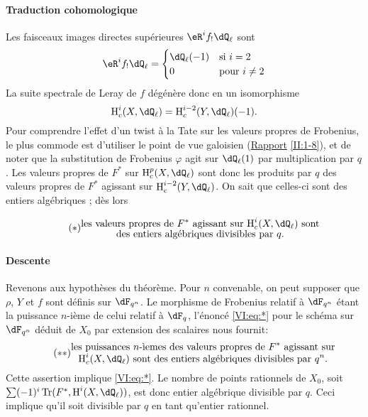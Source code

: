 \paragraph{Traduction cohomologique}
Les faisceaux images directes supérieures $\eR^i f_!\dQ_\ell$ sont 
\[
  \eR^i f_!\dQ_\ell = \begin{cases}
                       \dQ_\ell(-1) & \text{si $i = 2$} \\
                       0            & \text{pour $i\ne 2$}
                     \end{cases}
\]
La suite spectrale de Leray de $f$ dégénère donc en un isomorphisme 
\[
  \h_c^i(X,\dQ_\ell) = \h_c^{i-2}(Y,\dQ_\ell)(-1) \text{.}
\]
Pour comprendre l'effet d'un twist à la Tate sur les valeurs propres de 
Frobenius, le plus commode est d'utiliser le point de vue galoisien 
(\hyperref[II]{Rapport} \ref{II:1-8}), et de noter que la substitution de 
Frobenius $\varphi$ agit sur $\dQ_\ell(1)$ par multiplication par $q$. Les 
valeurs propres de $F^\ast$ sur $\h_c^p(X,\dQ_\ell)$ sont donc les produits par 
$q$ des valeurs propres de $F^\ast$ agissant sur $\h_c^{i-2}(Y,\dQ_\ell)$. On 
sait que celles-ci sont des entiers algébriques \cite[XXI 5.2.2]{sga7}; dès 
lors 

\begin{equation*}\tag{$*$}\label{VI:eq:*}
  \substack{\displaystyle\text{les valeurs propres de $F^\ast$ agissant sur $\h_c^i(X,\dQ_\ell)$ sont} \\
  \displaystyle\text{des entiers algébriques divisibles par $q$.}}
\end{equation*}


\paragraph{Descente}
Revenons aux hypothèses du théorème. Pour $n$ convenable, on peut 
supposer que $\rho$, $Y$ et $f$ sont définis sur $\dF_{q^n}$. Le morphisme de 
Frobenius relatif à $\dF_{q^n}$ étant la puissance $n$-ième de celui 
relatif à $\dF_q$, l'énoncé \eqref{VI:eq:*} pour le schéma sur 
$\dF_{q^n}$ déduit de $X_0$ par extension des scalaires nous fournit: 
\begin{equation*}\tag{$**$}\label{VI:eq:**}
  \substack{\displaystyle\text{les puissances $n$-\`iemes des valeurs propres de $F^\ast$ agissant sur} \\ \displaystyle\text{$\h_c^i(X,\dQ_\ell)$ sont des entiers algébriques divisibles par $q^n$.}}
\end{equation*}
Cette assertion implique \eqref{VI:eq:*}. Le nombre de points rationnels de 
$X_0$, soit $\sum (-1)^i \tr(F^\ast,\h^i(X,\dQ_\ell))$, est donc entier 
algébrique divisible par $q$. Ceci implique qu'il soit divisible par $q$ en 
tant qu'entier rationnel. 





